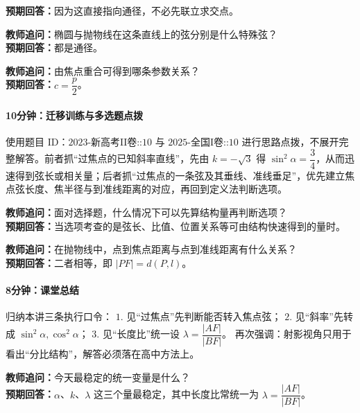 \documentclass[UTF8,a4paper,11pt]{ctexart}
\begin{document}
\textbf{预期回答：}因为这直接指向通径，不必先联立求交点。\par

\noindent\textbf{教师追问：}椭圆与抛物线在这条直线上的弦分别是什么特殊弦？\\

\textbf{预期回答：}都是通径。\par

\noindent\textbf{教师追问：}由焦点重合可得到哪条参数关系？\\

\textbf{预期回答：}$c=\dfrac p2$。\par

\paragraph{10分钟：迁移训练与多选题点拨}

使用题目 ID：$\text{2023-新高考II卷::10}$ 与 $\text{2025-全国I卷::10}$ 进行思路点拨，不展开完整解答。前者抓“过焦点的已知斜率直线”，先由 $k=-\sqrt3$ 得 $\sin^2\alpha=\dfrac34$，从而迅速得到弦长或相关量；后者抓“过焦点的一条弦及其垂线、准线垂足”，优先建立焦点弦长度、焦半径与到准线距离的对应，再回到定义法判断选项。

\noindent\textbf{教师追问：}面对选择题，什么情况下可以先算结构量再判断选项？\\

\textbf{预期回答：}当选项考查的是弦长、比值、位置关系等可由结构快速得到的量时。\par

\noindent\textbf{教师追问：}在抛物线中，点到焦点距离与点到准线距离有什么关系？\\

\textbf{预期回答：}二者相等，即 $|PF|=d(P,l)$。\par

\paragraph{8分钟：课堂总结}

归纳本讲三条执行口令：
$1.$ 见“过焦点”先判断能否转入焦点弦；
$2.$ 见“斜率”先转成 $\sin^2\alpha,\cos^2\alpha$；
$3.$ 见“长度比”统一设 $\lambda=\dfrac{|AF|}{|BF|}$。
再次强调：射影视角只用于看出“分比结构”，解答必须落在高中方法上。

\noindent\textbf{教师追问：}今天最稳定的统一变量是什么？\\

\textbf{预期回答：}$\alpha$、$k$、$\lambda$ 这三个量最稳定，其中长度比常统一为 $\lambda=\dfrac{|AF|}{|BF|}$。\par
\end{document}
